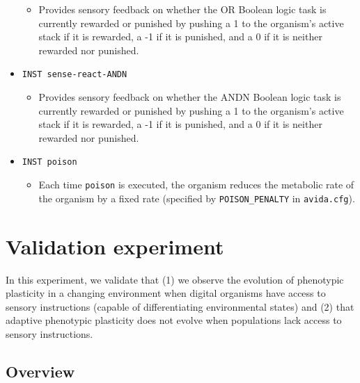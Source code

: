 \documentclass[]{book}
\providecommand{\tightlist}{%
  \setlength{\itemsep}{0pt}\setlength{\parskip}{0pt}}
\begin{document}
\begin{itemize}
  \begin{itemize}
  \tightlist
  \item
    Provides sensory feedback on whether the OR Boolean logic task is currently rewarded or punished by pushing a 1 to the organism's active stack if it is rewarded, a -1 if it is punished, and a 0 if it is neither rewarded nor punished.
  \end{itemize}
\item
  \texttt{INST\ sense-react-ANDN}

  \begin{itemize}
  \tightlist
  \item
    Provides sensory feedback on whether the ANDN Boolean logic task is currently rewarded or punished by pushing a 1 to the organism's active stack if it is rewarded, a -1 if it is punished, and a 0 if it is neither rewarded nor punished.
  \end{itemize}
\item
  \texttt{INST\ poison}

  \begin{itemize}
  \tightlist
  \item
    Each time \texttt{poison} is executed, the organism reduces the metabolic rate of the organism by a fixed rate (specified by \texttt{POISON\_PENALTY} in \texttt{avida.cfg}).
  \end{itemize}
\end{itemize}

\hypertarget{validation-experiment}{%
\chapter{Validation experiment}\label{validation-experiment}}

In this experiment, we validate that
(1) we observe the evolution of phenotypic plasticity in a changing environment when digital organisms have access to sensory instructions (capable of differentiating environmental states)
and (2) that adaptive phenotypic plasticity does not evolve when populations lack access to sensory instructions.

\hypertarget{overview}{%
\section{Overview}\label{overview}}
\end{document}
